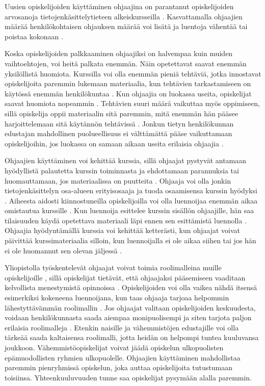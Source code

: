 \documentclass[finnish]{tktltiki2}
\theoremstyle{definition}
\theoremstyle{remark}
\begin{document}
Uusien opiskelijoiden käyttäminen ohjaajina on parantanut opiskelijoiden arvosanoja tietojenkäsittelytieteen alkeiskursseilla \cite{Decker06, Kurhila11}. Kasvattamalla ohjaajien määrää henkilökohtaisen ohjauksen määrää voi lisätä ja luentoja vähentää tai poistaa kokonaan \cite{Kurhila11}. \par

Koska opiskelijoiden palkkaaminen ohjaajiksi on halvempaa kuin muiden vaihtoehtojen, voi heitä palkata enemmän. Näin opetettavat saavat enemmän yksilöllistä huomiota. Kurssilla voi olla enemmän pieniä tehtäviä, jotka innostavat opiskelijoita paremmin lukemaan materiaalia, kun tehtävien tarkastamiseen on käytössä enemmän henkilökuntaa \cite{Dickson11}. Kun ohjaajia on luokassa useita, opiskelijat saavat huomiota nopeammin \cite{Ferstl10}. Tehtävien suuri määrä vaikuttaa myös oppimiseen, sillä opiskelija oppii materiaalin sitä paremmin, mitä enemmän hän pääsee harjoittelemaan sitä käytännön tehtävissä \cite{Vikberg}. Jonkun tietyn henkilökunnan edustajan mahdollinen puolueellisuus ei välttämättä pääse vaikuttamaan opiskelijoihin, jos luokassa on samaan aikaan useita erilaisia ohjaajia \cite{Morgan02}.  \par

Ohjaajien käyttäminen voi kehittää kurssia, sillä ohjaajat pystyvät antamaan hyödyllistä palautetta kurssin toiminnasta ja ehdottamaan parannuksia \cite{Decker06} tai huomauttamaan, jos materiaalissa on puutteita \cite{Dickson11}. Ohjaaja voi olla jonkin tietojenkäsittelyn osa-alueen erityisosaaja ja tuoda osaamisensa kurssin hyödyksi \cite{Dickson11}. Aiheesta aidosti kiinnostuneilla opiskelijoilla voi olla luennoijaa enemmän aikaa omistautua kurssille \cite{Dickson11}. Kun luennoija esittelee kurssin sisällön ohjaajille, hän saa tilaisuuden käydä opetettava materiaali läpi ennen sen esittämistä luennolla \cite{Kopp00}. Ohjaajia hyödyntämällä kurssia voi kehittää ketterästi, kun ohjaajat voivat päivittää kurssimateriaalia silloin, kun luennoijalla ei ole aikaa siihen tai jos hän ei ole huomannut sen olevan jäljessä \cite{Dickson11}. \par

Yliopistolla työskentelevät ohjaajat voivat toimia roolimalleina muille opiskelijoille \cite{Roberts95, Tashakkori05}, sillä opiskelijat tietävät, että ohjaajaksi pääsemiseen vaaditaan kelvollista menestymistä opinnoissa \cite{Bernstein}. Opiskelijoiden voi olla vaikea nähdä itsensä esimerkiksi kokeneena luennoijana, kun taas ohjaaja tarjoaa helpommin lähestyttävämmän roolimallin \cite{Roberts02}. Jos ohjaajat valitaan opiskelijoiden keskuudesta, voidaan henkilökunnasta saada aiempaa monipuolisempi ja siten tarjota paljon erilaisia roolimalleja \cite{Morgan02}. Etenkin naisille ja vähemmistöjen edustajille voi olla tärkeää saada kaltaisensa roolimalli, jotta heidän on helpompi tuntea kuuluvansa joukkoon. Vähemmistöopiskelijat voivat jäädä opiskelun ulkopuolisten epämuodollisten ryhmien ulkopuolelle. Ohjaajien käyttäminen mahdollistaa paremmin pienryhmissä opiskelun, joka auttaa opiskelijoita tutustumaan toisiinsa. Yhteenkuuluvuuden tunne saa opiskelijat pysymään alalla paremmin. \cite{Morgan02} \par
\end{document}
